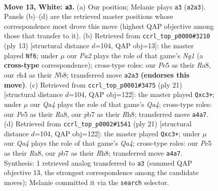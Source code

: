 \documentclass[11pt]{article}
\begin{document}
\begin{figure}[p]
\label{fig:thought-m22}
\end{figure}

\clearpage

\begin{figure}[p]\centering
\begin{subfigure}{0.46\textwidth}\centering
\resizebox{\linewidth}{!}{%
\newchessgame
\chessboard[
  setfen={r1bqk3/pp1n1pp1/4p3/3pP3/Qb1n1P1r/8/PP1N2PP/R1B1K1NR w KQq - 0 13},
  showmover=false,
  pgfstyle=straightmove, color=movearrow, markmove={a2-a3}
]}
\caption{}
\end{subfigure}\hfill
\begin{subfigure}{0.46\textwidth}\centering
\resizebox{\linewidth}{!}{%
\newchessgame
\chessboard[
  setfen={rnbqkbnr/p4ppp/4p3/1p6/2pPP3/1P3N2/5PPP/RNBQKB1R b KQkq - 0 7},
  showmover=false,
  pgfstyle=straightmove, color=movearrow, markmove={g8-f6}
]}
\caption{}
\end{subfigure}
\\[4pt]
\begin{subfigure}{0.46\textwidth}\centering
\resizebox{\linewidth}{!}{%
\newchessgame
\chessboard[
  setfen={r1b1k2r/pp1n1ppp/4pB2/qB6/3NP3/2P5/P4PPP/R2QK2R b KQkq - 0 11},
  showmover=false,
  pgfstyle=straightmove, color=movearrow, markmove={a5-c3}
]}
\caption{}
\end{subfigure}\hfill
\begin{subfigure}{0.46\textwidth}\centering
\resizebox{\linewidth}{!}{%
\newchessgame
\chessboard[
  setfen={r1b1k2r/pp1n1ppp/4pB2/qB6/3NP3/2P5/P4PPP/R2QK2R b KQkq - 0 11},
  showmover=false,
  pgfstyle=straightmove, color=movearrow, markmove={a5-c3}
]}
\caption{}
\end{subfigure}
\caption{\textbf{Move 13, White: \texttt{a3}.} (a) Our position; Melanie plays \texttt{a3} (\texttt{a2a3}). Panels (b)--(d) are the retrieved master positions whose correspondence most drove this move (highest QAP objective among those that transfer to it). (b) Retrieved from \texttt{ccrl\_top\_p0000\#3210} (ply 13) [structural distance $d$=104, QAP obj=13]: the master played \texttt{Nf6}; under $\mu$ our \emph{Pa2} plays the role of that game's \emph{Ng1} (a \textbf{cross-type} correspondence); cross-type roles: our \emph{P}e5 as their \emph{R}a8, our \emph{r}h4 as their \emph{N}b8; transferred move \texttt{a2a3} \textbf{(endorses this move)}. (c) Retrieved from \texttt{ccrl\_top\_p0001\#3475} (ply 21) [structural distance $d$=104, QAP obj=122]: the master played \texttt{Qxc3+}; under $\mu$ our \emph{Qa4} plays the role of that game's \emph{Qa4}; cross-type roles: our \emph{P}e5 as their \emph{R}a8, our \emph{p}b7 as their \emph{R}h8; transferred move \texttt{a4a7}. (d) Retrieved from \texttt{ccrl\_top\_p0002\#1541} (ply 21) [structural distance $d$=104, QAP obj=122]: the master played \texttt{Qxc3+}; under $\mu$ our \emph{Qa4} plays the role of that game's \emph{Qa4}; cross-type roles: our \emph{P}e5 as their \emph{R}a8, our \emph{p}b7 as their \emph{R}h8; transferred move \texttt{a4a7}. Synthesis: 1 retrieved analog transferred to \texttt{a3} (summed QAP objective 13, the strongest correspondence among the candidate moves); Melanie committed it via the \texttt{search} selector.}
\label{fig:thought-m24}
\end{figure}
\end{document}
